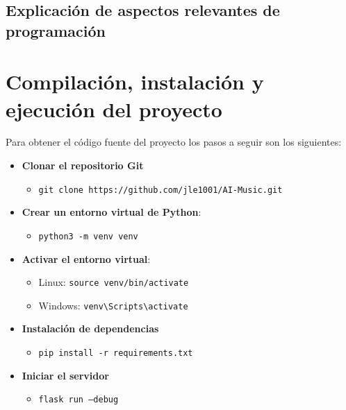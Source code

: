 \subsection{Explicación de aspectos relevantes de programación}

\section{Compilación, instalación y ejecución del proyecto}

Para obtener el código fuente del proyecto los pasos a seguir son los siguientes:

\begin{itemize}
\tightlist

\item \textbf{Clonar el repositorio Git}
	\begin{itemize}
	\tightlist
		\item \texttt{git clone https://github.com/jle1001/AI-Music.git}
	\end{itemize}

\item \textbf{Crear un entorno virtual de Python}: 
	\begin{itemize}
	\tightlist
		\item \texttt{python3 -m venv venv}
	\end{itemize}

\item \textbf{Activar el entorno virtual}: 
	\begin{itemize}
		\item Linux: \texttt{source venv/bin/activate}
		
		\item Windows: \texttt{venv\textbackslash Scripts\textbackslash activate}
	\end{itemize}

\item \textbf{Instalación de dependencias}
	\begin{itemize}
	\tightlist
		\item \texttt{pip install -r requirements.txt}
	\end{itemize}

\item \textbf{Iniciar el servidor}
	\begin{itemize}
	\tightlist
		\item \texttt{flask run --debug}
	\end{itemize}
\end{itemize}

